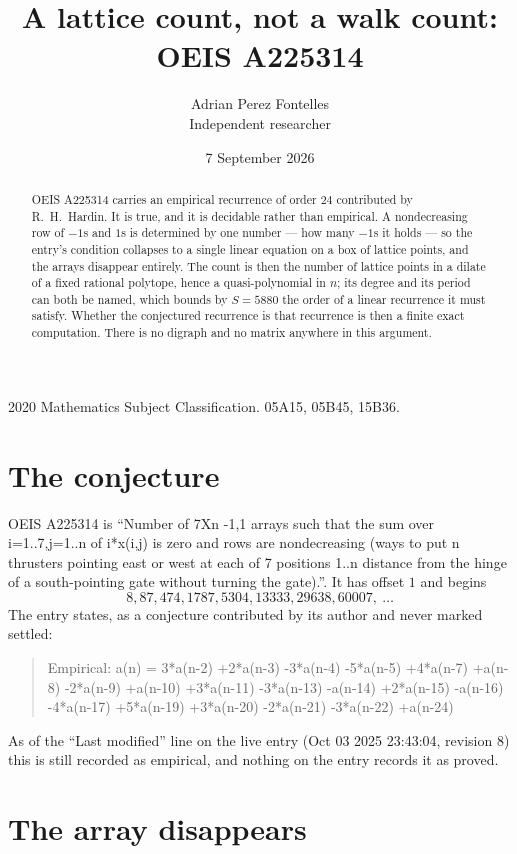 \documentclass[11pt,a4paper]{article}
\title{A lattice count, not a walk count: OEIS A225314}
\author{Adrian Perez Fontelles\\ \small Independent researcher}
\date{7 September 2026}
\theoremstyle{plain}
\theoremstyle{definition}
\begin{document}
\maketitle

\begin{abstract}
OEIS A225314 carries an empirical recurrence of order $24$ contributed by R.~H.~Hardin. It is
true, and it is decidable rather than empirical. A nondecreasing row of $-1$s and $1$s is
determined by one number --- how many $-1$s it holds --- so the entry's condition collapses to
a single linear equation on a box of lattice points, and the arrays disappear entirely. The
count is then the number of lattice points in a dilate of a fixed rational polytope, hence a
quasi-polynomial in $n$; its degree and its period can both be named, which bounds by
$S=5880$ the order of a linear recurrence it must satisfy. Whether the conjectured recurrence
is that recurrence is then a finite exact computation. There is no digraph and no matrix
anywhere in this argument.
\end{abstract}

\noindent\small 2020 Mathematics Subject Classification. 05A15, 05B45, 15B36.\normalsize

\section{The conjecture}

OEIS A225314 is ``Number of 7Xn -1,1 arrays such that the sum over i=1..7,j=1..n of i*x(i,j) is zero and rows are nondecreasing (ways to put n thrusters pointing east or west at each of 7 positions 1..n distance from the hinge of a south-pointing gate without turning the gate).''. It has offset $1$ and begins
\[
8, 87, 474, 1787, 5304, 13333, 29638, 60007,\ \dots
\]
The entry states, as a conjecture contributed by its author and never marked settled:
\begin{quote}
Empirical: a(n) = 3*a(n-2) +2*a(n-3) -3*a(n-4) -5*a(n-5) +4*a(n-7) +a(n-8) -2*a(n-9) +a(n-10) +3*a(n-11) -3*a(n-13) -a(n-14) +2*a(n-15) -a(n-16) -4*a(n-17) +5*a(n-19) +3*a(n-20) -2*a(n-21) -3*a(n-22) +a(n-24)
\end{quote}
As of the ``Last modified'' line on the live entry (Oct 03 2025 23:43:04, revision 8) this is still
recorded as empirical, and nothing on the entry records it as proved.

\section{The array disappears}
\end{document}
